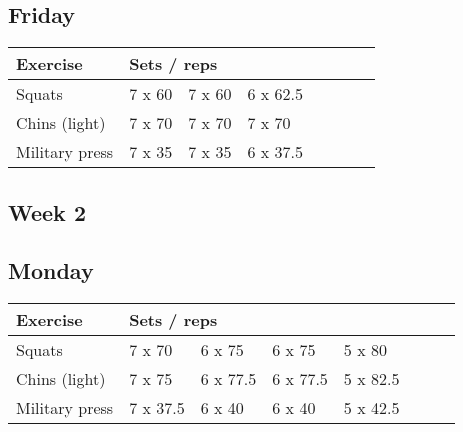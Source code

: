 \documentclass[12pt, a4paper]{article}%
\begin{document}
  \subsection*{\hspace{0.5em} Friday }


  \begin{tabular}{l|lllllll}
  \hspace{0.75em} \textbf{Exercise} & \multicolumn{ 7 }{l}{ \textbf{Sets / reps} } \\ \hline

            \hspace{0.75em} Squats
            & 7 x 60
            & 7 x 60
            & 6 x 62.5
            & 
            & 
            & 
            & 
            \\


            \hspace{0.75em} Chins (light)
            & 7 x 70
            & 7 x 70
            & 7 x 70
            & 
            & 
            & 
            & 
            \\


            \hspace{0.75em} Military press
            & 7 x 35
            & 7 x 35
            & 6 x 37.5
            & 
            & 
            & 
            & 
            \\


  \end{tabular}

 \subsection*{\hspace{0.25em} Week 2 }
  \subsection*{\hspace{0.5em} Monday }


  \begin{tabular}{l|lllllll}
  \hspace{0.75em} \textbf{Exercise} & \multicolumn{ 7 }{l}{ \textbf{Sets / reps} } \\ \hline

            \hspace{0.75em} Squats
            & 7 x 70
            & 6 x 75
            & 6 x 75
            & 5 x 80
            & 
            & 
            & 
            \\


            \hspace{0.75em} Chins (light)
            & 7 x 75
            & 6 x 77.5
            & 6 x 77.5
            & 5 x 82.5
            & 
            & 
            & 
            \\


            \hspace{0.75em} Military press
            & 7 x 37.5
            & 6 x 40
            & 6 x 40
            & 5 x 42.5
            & 
            & 
            & 
            \\


  \end{tabular}
\end{document}
